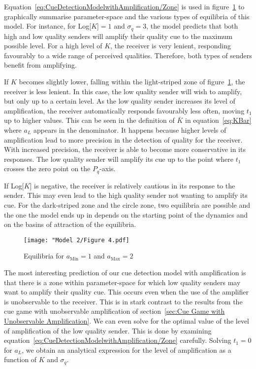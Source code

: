 \documentclass[a4paper,12pt]{article}
\numberwithin{equation}{section}
\begin{document}
\newpage

Equation~\ref{eq:CueDetectionModelwithAmplification/Zone} is used in figure~\ref{fig:Model 2/Figure 4.pdf} to graphically summarise parameter-space and the various types of equilibria of this model. For instance, for Log[$K$]$=1$ and $\sigma_{q}=3$, the model predicts that both high and low quality senders will amplify their quality cue to the maximum possible level. For a high level of $K$, the receiver is very lenient, responding favourably to a wide range of perceived qualities. Therefore, both types of senders benefit from amplifying.

If $K$ becomes slightly lower, falling within the light-striped zone of figure~\ref{fig:Model 2/Figure 4.pdf}, the receiver is less lenient. In this case, the low quality sender will wish to amplify, but only up to a certain level. As the low quality sender increases its level of amplification, the receiver automatically responds favourably less often, moving $t_{1}$ up to higher values. This can be seen in the definition of $\bar{K}$ in equation~\ref{eq:KBar} where $a_{L}$ appears in the denominator. It happens because higher levels of amplification lead to more precision in the detection of quality for the receiver. With increased precision, the receiver is able to become more conservative in its responses. The low quality sender will amplify its cue up to the point where $t_{1}$ crosses the zero point on the $P_{q}$-axis.

If Log[$K$] is negative, the receiver is relatively cautious in its response to the sender. This may even lead to the high quality sender not wanting to amplify its cue. For the dark-striped zone and the circle zone, two equilibria are possible and the one the model ends up in depends on the starting point of the dynamics and on the basins of attraction of the equilibria.

\begin{figure}[h]
\begin{center}
\leavevmode
\texttt{[image: "Model 2/Figure 4.pdf]}
\caption{Equilibria for $a_{\text{Min}}=1$ and $a_{\text{Max}}=2$}
\label{fig:Model 2/Figure 4.pdf}
\end{center}
\end{figure}

The most interesting prediction of our cue detection model with amplification is that there is a zone within parameter-space for which low quality senders may want to amplify their quality cue. This occurs even when the use of the amplifier is unobservable to the receiver. This is in stark contrast to the results from the cue game with unobservable amplification of section~\ref{sec:Cue Game with Unobservable Amplification}. We can even solve for the optimal value of the level of amplification of the low quality sender. This is done by examining equation~\ref{eq:CueDetectionModelwithAmplification/Zone} carefully. Solving $t_{1}=0$ for $a_{L}$, we obtain an analytical expression for the level of amplification as a function of $K$ and $\sigma_{q}$.
\end{document}
